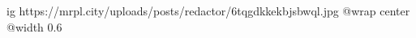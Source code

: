  
 
 
 
 

\ifcmt
  ig https://mrpl.city/uploads/posts/redactor/6tqgdkkekbjsbwql.jpg
  @wrap center
  @width 0.6
\fi
